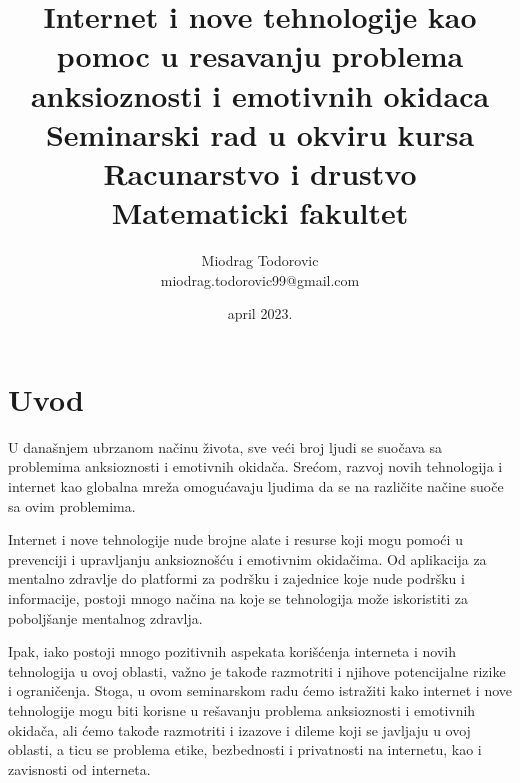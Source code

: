 \documentclass[a4paper]{article}
\begin{document}
\title{Internet i nove tehnologije kao pomoc u resavanju problema anksioznosti i emotivnih okidaca\\ \small{Seminarski rad u okviru kursa\\Racunarstvo i drustvo\\ Matematicki fakultet}}

\author{Miodrag Todorovic\\ miodrag.todorovic99@gmail.com}
\date{april 2023.}
\maketitle


\tableofcontents

\newpage

\section{Uvod}
\label{sec:uvod}
U današnjem ubrzanom načinu života, sve veći broj ljudi se suočava sa problemima anksioznosti i emotivnih okidača. Srećom, razvoj novih tehnologija i internet kao globalna mreža omogućavaju ljudima da se na različite načine suoče sa ovim problemima.

Internet i nove tehnologije nude brojne alate i resurse koji mogu pomoći u prevenciji i upravljanju anksioznošću i emotivnim okidačima. Od aplikacija za mentalno zdravlje do platformi za podršku i zajednice koje nude podršku i informacije, postoji mnogo načina na koje se tehnologija može iskoristiti za poboljšanje mentalnog zdravlja.

Ipak, iako postoji mnogo pozitivnih aspekata korišćenja interneta i novih tehnologija u ovoj oblasti, važno je takođe razmotriti i njihove potencijalne rizike i ograničenja. Stoga, u ovom seminarskom radu ćemo istražiti kako internet i nove tehnologije mogu biti korisne u rešavanju problema anksioznosti i emotivnih okidača, ali ćemo takođe razmotriti i izazove i dileme koji se javljaju u ovoj oblasti, a ticu se problema etike, bezbednosti i privatnosti na internetu, kao i zavisnosti od interneta.
\end{document}
